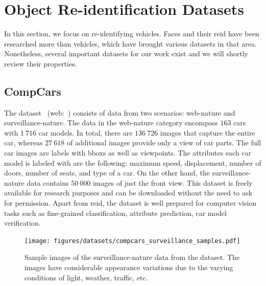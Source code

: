 \section{Object Re-identification Datasets}
\label{sec:ObjectReIDDatasets}

In this section, we focus on re-identifying vehicles. Faces and their \gls{reid} have been researched more than vehicles, which have brought various datasets in that area. Nonetheless, several important datasets for our work exist and we will shortly review their properties. 

\subsection{CompCars}
\label{ssec:DatasetCompCars}

The  dataset~\cite{Yang2015} (web:~\cite{compcarsdataset}) consists of data from two scenarios: web-nature and surveillance-nature. The data in the web-nature category encompass $163$ cars with $1\ 716$ car models. In total, there are $136\ 726$ images that capture the entire car, whereas $27\ 618$ of additional images provide only a view of car parts. The full car images are labels with \glspl{bbox} as well as viewpoints. The attributes each car model is labeled with are the following: maximum speed, displacement, number of doors, number of seats, and type of a car. On the other hand, the surveillance-nature data contains $50\ 000$ images of just the front view. This dataset is freely available for research purposes and can be downloaded without the need to ask for permission. Apart from \gls{reid}, the dataset is well prepared for computer vision tasks such as fine-grained classification, attribute prediction, car model verification.

\begin{figure}[t]
    \centerline{\texttt{[image: figures/datasets/compcars\_surveillance\_samples.pdf]}}
    \caption[ dataset]{Sample images of the surveillance-nature data from the  dataset. The images have considerable appearance variations due to the varying conditions of light, weather, traffic, etc. }
    \label{fig:DatasetCompCarsSurveillance}
\end{figure}


